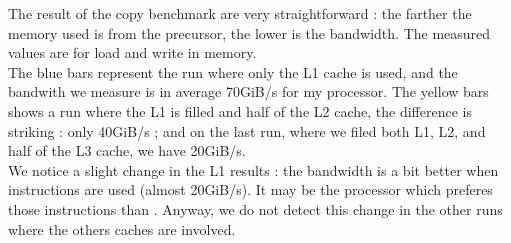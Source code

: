 
The result of the copy benchmark are very straightforward : the farther the memory used is from the precursor, the lower is the bandwidth. The measured values are for load and write in memory.\\

The blue bars represent the run where only the L1 cache is used, and the bandwith we measure is in average 70GiB/s for my processor.
The yellow bars shows a run where the L1 is filled and half of the L2 cache, the difference is striking : only 40GiB/s ; and on the last run, where we filed both L1, L2, and half of the L3 cache, we have 20GiB/s.\\


We notice a slight change in the L1 results : the bandwidth is a bit better when  instructions are used (almost 20GiB/s). It may be the processor which preferes those instructions than . Anyway, we do not detect this change in the other runs where the others caches are involved.